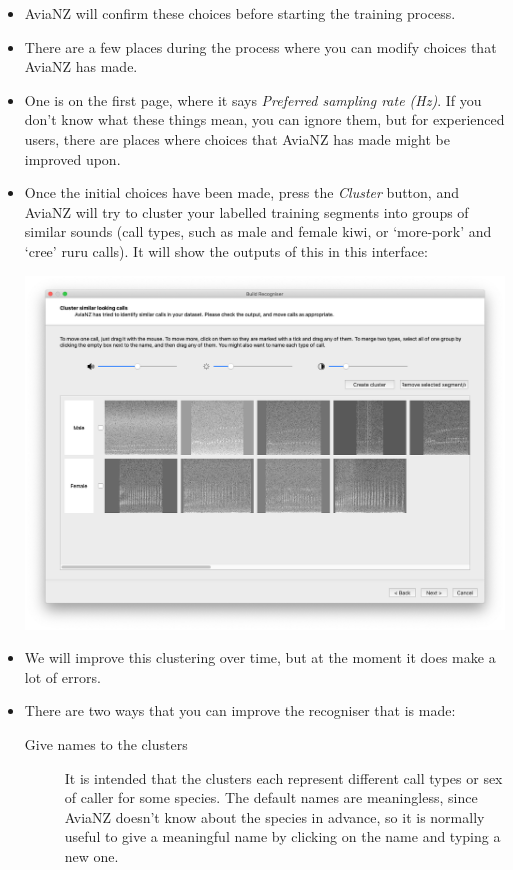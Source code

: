 \documentclass{scrartcl}
\begin{document}
\begin{itemize}
\item AviaNZ will confirm these choices before starting the training process. 
\item There are a few places during the process where you can modify choices that AviaNZ has made. 
\item One is on the first page, where it says \textit{Preferred sampling rate (Hz)}. If you don't know what these things mean, you can ignore them, but for experienced users, there are places where choices that AviaNZ has made might be improved upon.
\item Once the initial choices have been made, press the \textit{Cluster} button, and AviaNZ will try to cluster your labelled training segments into groups of similar sounds (call types, such as male and female kiwi, or `more-pork' and `cree' ruru calls). It will show the outputs of this in this interface:
\begin{center}
    \includegraphics[width=.95\textwidth]{Figures/BuildRecogniser2}
\end{center}
\item We will improve this clustering over time, but at the moment it does make a lot of errors. 
\item There are two ways that you can improve the recogniser that is made:

\begin{description}
\item[Give names to the clusters] It is intended that the clusters each represent different call types or sex of caller for some species. The default names are meaningless, since AviaNZ doesn't know about the species in advance, so it is normally useful to give a meaningful name by clicking on the name and typing a new one. 


\end{description}
\end{itemize}
\end{document}

